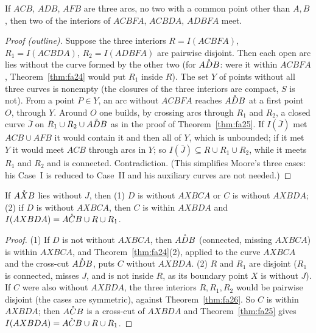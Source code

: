 
\begin{theorem}[F.A.\ Theorem~26]\label{thm:fa26}
If $ACB$, $ADB$, $AFB$ are three arcs, no two with a common point other than $A,B$, then two of the interiors of
$ACBFA$, $ACBDA$, $ADBFA$ meet.
\end{theorem}

\begin{proof}[Proof (outline)]
Suppose the three interiors $R=I(ACBFA)$, $R_1=I(ACBDA)$, $R_2=I(ADBFA)$ are pairwise disjoint. Then each open arc
lies without the curve formed by the other two (for $\mathring{ADB}$: were it within $ACBFA$, Theorem~\ref{thm:fa24} would put
$R_1$ inside $R$). The set $Y$ of points without all three curves is nonempty (the closures of the three interiors are
compact, $S$ is not). From a point $P\in Y$, an arc without $ACBFA$ reaches $\mathring{ADB}$ at a first point $O$, through $Y$.
Around $O$ one builds, by crossing arcs through $R_1$ and $R_2$, a closed curve $\bar J$ on $R_1\cup R_2\cup\mathring{ADB}$ as in
the proof of Theorem~\ref{thm:fa25}. If $I(\bar J)$ met $ACB\cup AFB$ it would contain it and then all of $Y$, which is
unbounded; if it met $Y$ it would meet $ACB$ through arcs in $Y$; so $I(\bar J)\subseteq R\cup R_1\cup R_2$, while it meets
$R_1$ and $R_2$ and is connected. Contradiction. (This simplifies Moore's three cases: his Case~I is reduced to Case~II and
his auxiliary curves are not needed.)
\end{proof}


\begin{theorem}[F.A.\ Theorem~27]\label{thm:fa27}
If $\mathring{AXB}$ lies without $J$, then (1) $D$ is without $AXBCA$ or $C$ is without $AXBDA$; (2) if $D$ is without
$AXBCA$, then $C$ is within $AXBDA$ and $I(AXBDA)=\mathring{ACB}\cup R\cup R_1$.
\end{theorem}

\begin{proof}
(1) If $D$ is not without $AXBCA$, then $\mathring{ADB}$ (connected, missing $AXBCA$) is within $AXBCA$, and
Theorem~\ref{thm:fa24}(2), applied to the curve $AXBCA$ and the cross-cut $\mathring{ADB}$, puts $C$ without $AXBDA$.
(2) $R$ and $R_1$ are disjoint ($R_1$ is connected, misses $J$, and is not inside $R$, as its boundary point $X$ is
without $J$). If $C$ were also without $AXBDA$, the three interiors $R,R_1,R_2$ would be pairwise disjoint
(the cases are symmetric), against Theorem~\ref{thm:fa26}. So $C$ is within $AXBDA$; then $\mathring{ACB}$ is a
cross-cut of $AXBDA$ and Theorem~\ref{thm:fa25} gives $I(AXBDA)=\mathring{ACB}\cup R\cup R_1$.
\end{proof}


